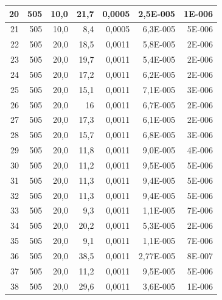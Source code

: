 \documentclass[12pt]{scrartcl}
\begin{document}
\begin{table}[H]
\begin{center}
\begin{tabular}{|r|r|r|r|r|r|r|}
20 & 505 & 10,0 & 21,7 & 0,0005  & 2,5E-005 & 1E-006 \\ \hline
21 & 505 & 10,0 & 8,4 & 0,0005  & 6,3E-005 & 5E-006 \\ \hline
22 & 505 & 20,0 & 18,5 & 0,0011  & 5,8E-005 & 2E-006 \\ \hline
23 & 505 & 20,0 & 19,7 & 0,0011  & 5,4E-005 & 2E-006 \\ \hline
24 & 505 & 20,0 & 17,2 & 0,0011  & 6,2E-005 & 2E-006 \\ \hline
25 & 505 & 20,0 & 15,1 & 0,0011  & 7,1E-005 & 3E-006 \\ \hline
26 & 505 & 20,0 & 16 & 0,0011  & 6,7E-005 & 2E-006 \\ \hline
27 & 505 & 20,0 & 17,3 & 0,0011  & 6,1E-005 & 2E-006 \\ \hline
28  & 505 & 20,0 & 15,7 & 0,0011  & 6,8E-005 & 3E-006 \\ \hline
29 & 505 & 20,0 & 11,8 & 0,0011  & 9,0E-005 & 4E-006 \\ \hline
30 & 505 & 20,0 & 11,2 & 0,0011  & 9,5E-005 & 5E-006 \\ \hline
31 & 505 & 20,0 & 11,3 & 0,0011  & 9,4E-005 & 5E-006 \\ \hline
32 & 505 & 20,0 & 11,3 & 0,0011  & 9,4E-005 & 5E-006 \\ \hline
33 & 505 & 20,0 & 9,3 & 0,0011  & 1,1E-005 & 7E-006 \\ \hline
34 & 505 & 20,0 & 20,2 & 0,0011  & 5,3E-005 & 2E-006 \\ \hline
35 & 505 & 20,0 & 9,1 & 0,0011  & 1,1E-005 & 7E-006 \\ \hline
36 & 505 & 20,0 & 38,5 & 0,0011  & 2,77E-005 & 8E-007 \\ \hline
37 & 505 & 20,0 & 11,2 & 0,0011  & 9,5E-005 & 5E-006 \\ \hline
38 & 505 & 20,0 & 29,6 & 0,0011  & 3,6E-005 & 1E-006 \\ \hline
\end{tabular}
\end{center}
\label{tab:messwerte_1}
\end{table}
\end{document}

